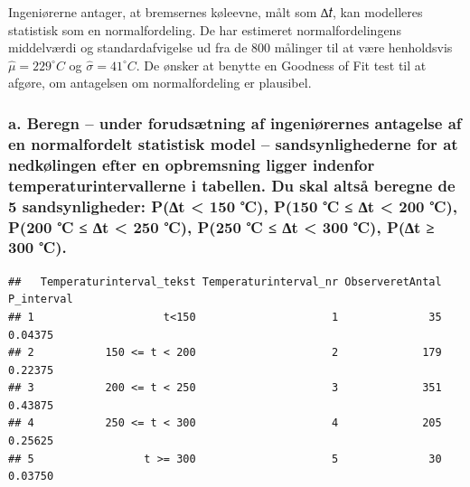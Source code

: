 \documentclass[
]{article}
\newenvironment{Shaded}{\begin{snugshade}}{\end{snugshade}}
\newcommand{\AttributeTok}[1]{\textcolor[rgb]{0.13,0.29,0.53}{#1}}
\newcommand{\ConstantTok}[1]{\textcolor[rgb]{0.56,0.35,0.01}{#1}}
\newcommand{\DecValTok}[1]{\textcolor[rgb]{0.00,0.00,0.81}{#1}}
\newcommand{\FunctionTok}[1]{\textcolor[rgb]{0.13,0.29,0.53}{\textbf{#1}}}
\newcommand{\NormalTok}[1]{#1}
\newcommand{\OtherTok}[1]{\textcolor[rgb]{0.56,0.35,0.01}{#1}}
\newcommand{\SpecialCharTok}[1]{\textcolor[rgb]{0.81,0.36,0.00}{\textbf{#1}}}
\newcommand{\StringTok}[1]{\textcolor[rgb]{0.31,0.60,0.02}{#1}}
\begin{document}
Ingeniørerne antager, at bremsernes køleevne, målt som ∆𝑡, kan
modelleres statistisk som en normalfordeling. De har estimeret
normalfordelingens middelværdi og standardafvigelse ud fra de 800
målinger til at være henholdsvis \(\hat{\mu} = 229^{\circ}C\) og
\(\hat{\sigma} = 41^{\circ}C\). De ønsker at benytte en Goodness of Fit
test til at afgøre, om antagelsen om normalfordeling er plausibel.

\subsubsection{a. Beregn -- under forudsætning af ingeniørernes
antagelse af en normalfordelt statistisk model -- sandsynlighederne for
at nedkølingen efter en opbremsning ligger indenfor
temperaturintervallerne i tabellen. Du skal altså beregne de 5
sandsynligheder: P(∆t \textless{} 150 ℃), P(150 ℃ ≤ ∆t \textless{} 200
℃), P(200 ℃ ≤ ∆t \textless{} 250 ℃), P(250 ℃ ≤ ∆t \textless{} 300 ℃),
P(∆t ≥ 300
℃).}\label{a.-beregn-under-forudsuxe6tning-af-ingeniuxf8rernes-antagelse-af-en-normalfordelt-statistisk-model-sandsynlighederne-for-at-nedkuxf8lingen-efter-en-opbremsning-ligger-indenfor-temperaturintervallerne-i-tabellen.-du-skal-altsuxe5-beregne-de-5-sandsynligheder-pt-150-p150-t-200-p200-t-250-p250-t-300-pt-300-.}

\begin{Shaded}
\end{Shaded}

\begin{verbatim}
##   Temperaturinterval_tekst Temperaturinterval_nr ObserveretAntal P_interval
## 1                    t<150                     1              35    0.04375
## 2           150 <= t < 200                     2             179    0.22375
## 3           200 <= t < 250                     3             351    0.43875
## 4           250 <= t < 300                     4             205    0.25625
## 5                 t >= 300                     5              30    0.03750
\end{verbatim}
\end{document}
